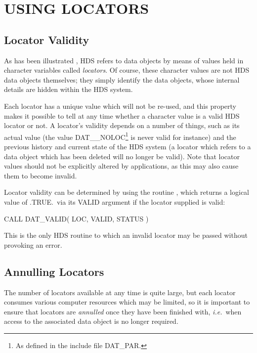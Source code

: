 \documentclass[twoside,11pt]{starlink}
\providecommand{\st}[1]{{\emph{#1}}}
\begin{document}
\section{\label{sect:locators}USING LOCATORS}

\subsection{Locator Validity}

As has been illustrated , HDS
refers to data objects by means of values held in character variables
called \st{locators}.  Of course, these character values are not HDS
data objects themselves; they simply identify the data objects, whose
internal details are hidden within the HDS system.

Each locator has a unique value which will not be re-used, and this
property makes it possible to tell at any time whether a character
value is a valid HDS locator or not.  A locator's validity depends on
a number of things, such as its actual value (the value
DAT\_\_NOLOC\footnote{As defined in the include file DAT\_PAR.} is
never valid for instance) and the previous history and current state
of the HDS system (a locator which refers to a data object which has
been deleted will no longer be valid).  Note that locator values
should not be explicitly altered by applications, as this may also
cause them to become invalid.

Locator validity can be determined by using the routine
, which returns a logical value of
.TRUE.\ via its VALID argument if the locator supplied is valid:

\begin{small}
\begin{terminalv}
CALL DAT_VALID( LOC, VALID, STATUS )
\end{terminalv}
\end{small}

This is the only HDS routine to which an invalid locator may be passed
without provoking an error.

\subsection{\label{sect:annul}Annulling Locators}

The number of locators available at any time is quite large, but each
locator consumes various computer resources which may be limited, so
it is important to ensure that locators are \st{annulled\/} once they
have been finished with, \st{i.e.}\ when access to the associated
data object is no longer required.
\end{document}
